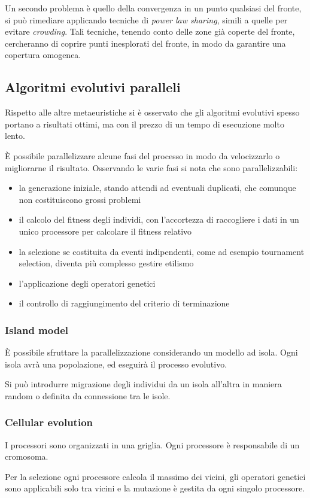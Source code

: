 \documentclass[a4paper]{article}
\begin{document}
Un secondo problema è quello della convergenza in un punto qualsiasi del fronte, 
si può rimediare applicando tecniche di \emph{power law sharing}, simili a quelle 
per evitare \emph{crowding}. Tali tecniche, tenendo conto delle zone già 
coperte del fronte, cercheranno di coprire punti inesplorati del fronte, 
in modo da garantire una copertura omogenea.

\subsection{Algoritmi evolutivi paralleli}
Rispetto alle altre metaeuristiche si è osservato che gli algoritmi evolutivi spesso
portano a risultati ottimi, ma con il prezzo di un tempo di esecuzione molto lento.

È possibile parallelizzare alcune fasi del processo in modo da 
velocizzarlo o migliorarne il risultato.
Osservando le varie fasi si nota che sono parallelizzabili:
\begin{itemize}
    \item la generazione iniziale, stando attendi ad eventuali duplicati, 
    che comunque non costituiscono grossi problemi
    \item il calcolo del fitness degli individi, con l'accortezza di raccogliere i dati in un unico processore per 
    calcolare il fitness relativo
    \item la selezione se costituita da eventi indipendenti, come ad esempio tournament selection, 
    diventa più complesso gestire etilismo
    \item l'applicazione degli operatori genetici
    \item il controllo di raggiungimento del criterio di terminazione
\end{itemize}

\subsubsection{Island model}
È possibile sfruttare la parallelizzazione considerando un modello ad isola.
Ogni isola avrà una popolazione, ed eseguirà il processo evolutivo.

Si può introdurre migrazione degli individui da un isola all'altra in maniera
random o definita da connessione tra le isole.

\subsubsection{Cellular evolution}
I processori sono organizzati in una griglia. Ogni processore è responsabile di un cromosoma.

Per la selezione ogni processore calcola il massimo dei vicini, gli operatori genetici sono applicabili 
solo tra vicini e la mutazione è gestita da ogni singolo processore.
\end{document}
